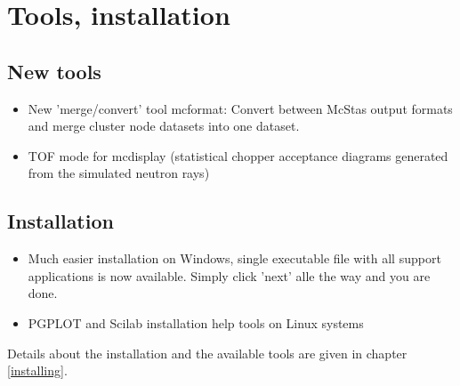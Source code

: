 \section{Tools, installation}
\label{s:new-features:tools}
\subsection{New tools} 
\begin{itemize}
\item New 'merge/convert' tool mcformat: Convert between McStas output formats and merge cluster
    node datasets into one dataset.
\item TOF mode for mcdisplay (statistical chopper acceptance diagrams generated from the simulated
    neutron rays)
\end{itemize}
\subsection{Installation}
\begin{itemize}
\item Much easier installation on Windows, single executable file with all support applications
    is now available. Simply click 'next' alle the way and you are done.
\item PGPLOT and Scilab installation help tools on Linux systems
\end{itemize}
Details about the installation and the available tools are given in chapter \ref{installing}.

